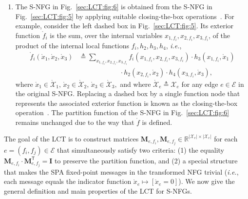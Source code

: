 \documentclass[journal]{IEEEtran}
\newcommand{\add}[1]{{\color{black}#1}}
\newcommand{\vect}[1]{ \bm{#1} }
\newcommand{\set}[1]{\mathcal{#1}}
\newcommand{\setEfull}{ \mathcal{E} }
\newcommand{\sR}{\mathbb{R}}
\newcommand{\tran}{\mathsf{T}}
\newcommand{\setxe}{ \mathcal{X}_{e} }
\newcommand{\defeq}{ \triangleq }
\newcommand{\matr}[1]{\vect{#1}}
\newcommand{\LCTset}[1]{\mathring{\mathcal{#1}}}
\newcommand{\LCT}[1]{ \mathring{#1} }
\newcommand{\efi}{ e,f_i }
\newcommand{\efj}{ e,f_j }
\newcommand*{\ie}{\textit{i.e.}}
\begin{document}
\begin{enumerate}
  \item The S-NFG in Fig.~\ref{sec:LCT:fig:6} is obtained from the S-NFG
        in Fig.~\ref{sec:LCT:fig:5} by applying suitable closing-the-box
        operations~\cite{Loeliger2004}. For example, consider the left dashed box in Fig.~\ref{sec:LCT:fig:5}. Its exterior function $ \LCT{f}_{i} $ is the sum, over the internal variables $ x_{1,f_{i}},x_{2,f_{i}}, x_{3,f_{i}} $, of the product of the internal local functions $ f_{i},h_{2},h_{3},h_{4} $, \ie,
        \begin{align*}
          \LCT{f}_{i}(\LCT{x}_{1}, \LCT{x}_{2}, \LCT{x}_{3})
           & \defeq \!\!\! \!\!\! \sum_{x_{1,f_{i}},x_{2,f_{i}},x_{3,f_{i}}} \!\!\!
          \!\!\!\!\!\!\!\!\!
          f_{i}(x_{1,f_{i}}, x_{2,f_{i}}, x_{3,f_{i}})
          \cdot h_3(x_{1,f_{i}}, \LCT{x}_{1})
          \\
           & \qquad\qquad\qquad
          \cdot
          h_2(x_{2,f_{i}}, \LCT{x}_{2})
          \cdot
          h_4(x_{3,f_{i}}, \LCT{x}_{3}),
        \end{align*}
        where $ \LCT{x}_{1} \in \LCTset{X}_{1},\, \LCT{x}_{2}\in \LCTset{X}_{2},\, \LCT{x}_{3}\in \LCTset{X}_{3},$
        and where $\LCTset{X}_{e} \defeq \set{X}_{e}$ for any edge $ e \in \setEfull $ in the original S-NFG.
        Replacing a dashed box by a single function node that represents the associated exterior function is known as the closing-the-box operation~\cite{Loeliger2004}.
        The partition function of the S-NFG in Fig.~\ref{sec:LCT:fig:6} remains unchanged due to the way that $\LCT{f}$ is defined.

\end{enumerate}

The goal of the LCT is to construct matrices
$\matr{M}_{\efi},\matr{M}_{\efj} \in \sR^{|\setxe| \times |\setxe|}$ for each
$e = (f_{i},f_{j}) \in \setEfull$ that simultaneously satisfy two criteria:
(1) the equality $\matr{M}_{\efi} \cdot \matr{M}_{\efj}^{\tran} = \matr{I}$ to
preserve the partition function, and (2) a special structure that makes the
SPA fixed-point messages in the transformed NFG trivial (\ie, \add{each
  message equals the indicator function
  $\LCT{x}_e \mapsto [\LCT{x}_e \!=\! 0]$}). We now give the general
definition and main properties of the LCT for S-NFGs.


\end{document}
